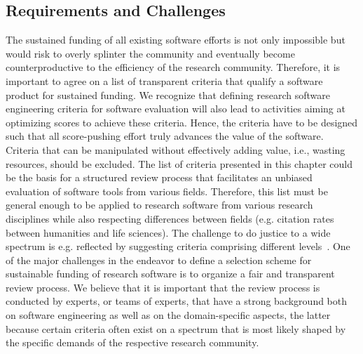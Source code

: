 \documentclass[a4paper,num-refs,numbers,sort&compress]{de-rse}
\begin{document}
\subsection{Requirements and Challenges}
The sustained funding of all existing software efforts is not only impossible but would risk to overly splinter the community and eventually become counterproductive to the efficiency of the research community. Therefore, it is important to agree on a list of transparent criteria that qualify a software product for sustained funding.
We recognize that defining research software engineering criteria for software evaluation will also lead to activities aiming at optimizing scores to achieve these criteria. Hence, the criteria have to be designed such that all score-pushing effort truly advances the value of the software. Criteria that can be manipulated without effectively adding value, i.e., wasting resources, should be excluded.
The list of criteria presented in this chapter could be the basis for a structured review process that facilitates an unbiased evaluation of software tools from various fields. Therefore, this list must be general enough to be applied to research software from various research disciplines while also respecting differences between fields (e.g. citation rates between humanities and life sciences). The challenge to do justice to a wide spectrum is e.g. reflected by suggesting criteria comprising different levels~\cite{ChueHong2014}.
One of the major challenges in the endeavor to define a selection scheme for sustainable funding of research software is to organize a fair and transparent review process. We believe that it is important that the review process is conducted by experts, or teams of experts, that have a strong background both on software engineering as well as on the domain-specific aspects, the latter because certain criteria often exist on a spectrum that is most likely shaped by the specific demands of the respective research community.
\end{document}
